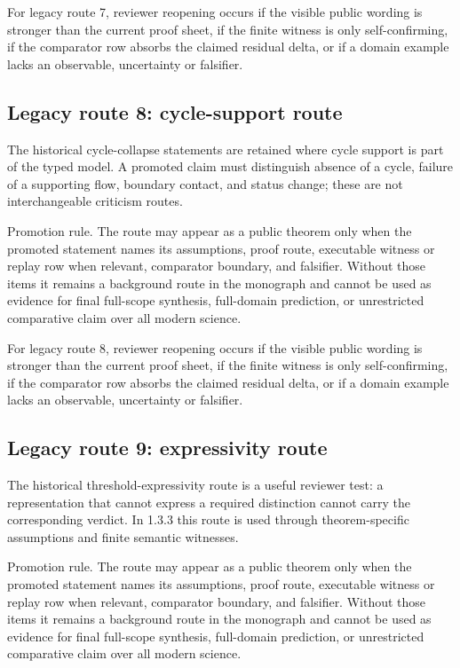 For legacy route 7, reviewer reopening occurs if the visible public wording is stronger than the current proof sheet, if the finite witness is only self-confirming, if the comparator row absorbs the claimed residual delta, or if a domain example lacks an observable, uncertainty or falsifier.


\subsection{Legacy route 8: cycle-support route}

The historical cycle-collapse statements are retained where cycle support is part of the typed model. A promoted claim must distinguish absence of a cycle, failure of a supporting flow, boundary contact, and status change; these are not interchangeable criticism routes.


Promotion rule. The route may appear as a public theorem only when the promoted statement names its assumptions, proof route, executable witness or replay row when relevant, comparator boundary, and falsifier. Without those items it remains a background route in the monograph and cannot be used as evidence for final full-scope synthesis, full-domain prediction, or unrestricted comparative claim over all modern science.


For legacy route 8, reviewer reopening occurs if the visible public wording is stronger than the current proof sheet, if the finite witness is only self-confirming, if the comparator row absorbs the claimed residual delta, or if a domain example lacks an observable, uncertainty or falsifier.


\subsection{Legacy route 9: expressivity route}

The historical threshold-expressivity route is a useful reviewer test: a representation that cannot express a required distinction cannot carry the corresponding verdict. In 1.3.3 this route is used through theorem-specific assumptions and finite semantic witnesses.


Promotion rule. The route may appear as a public theorem only when the promoted statement names its assumptions, proof route, executable witness or replay row when relevant, comparator boundary, and falsifier. Without those items it remains a background route in the monograph and cannot be used as evidence for final full-scope synthesis, full-domain prediction, or unrestricted comparative claim over all modern science.


